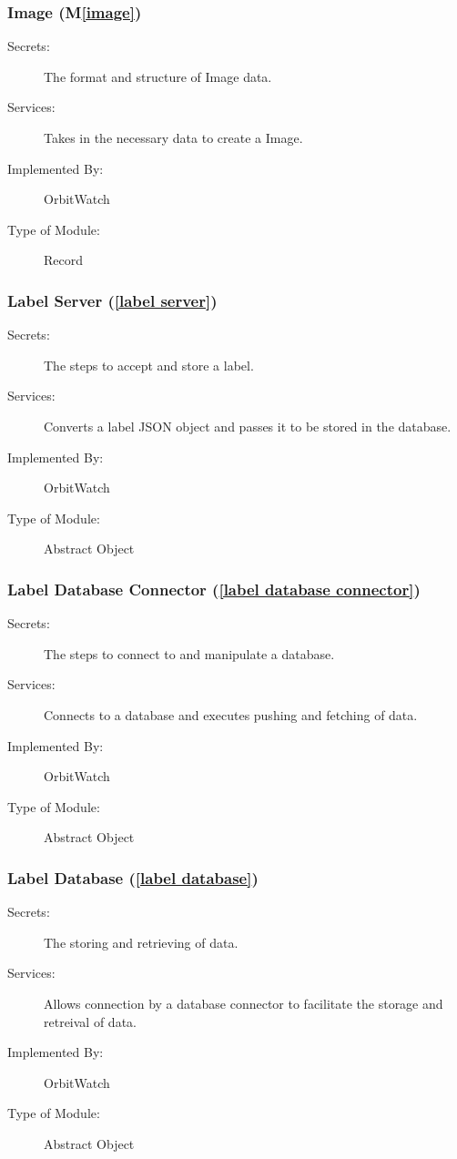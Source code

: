 \documentclass[12pt, titlepage]{article}
\newcommand{\mref}[1]{M\ref{#1}}
\begin{document}
\subsubsection{Image (\mref{image})}

\begin{description}
\item[Secrets:]The format and structure of Image data.
\item[Services:] Takes in the necessary data to create a Image.
\item[Implemented By:] OrbitWatch
\item[Type of Module:] Record
\end{description}


\subsubsection{Label Server (\ref{label server})} 
\begin{description}
  \item[Secrets:] The steps to accept and store a label.
  \item[Services:] Converts a label JSON object and passes it to be stored in the database.
  \item[Implemented By:] OrbitWatch
  \item[Type of Module:] Abstract Object
  \end{description}

\subsubsection{Label Database Connector (\ref{label database connector})}
\begin{description}
\item[Secrets:] The steps to connect to and manipulate a database.
\item[Services:] Connects to a database and executes pushing and fetching of data.
\item[Implemented By:] OrbitWatch
\item[Type of Module:] Abstract Object
\end{description}

\subsubsection{Label Database (\ref{label database})}
\begin{description}
\item[Secrets:] The storing and retrieving of data.
\item[Services:] Allows connection by a database connector to facilitate the storage and retreival of data.
\item[Implemented By:] OrbitWatch
\item[Type of Module:] Abstract Object
\end{description}
\end{document}
